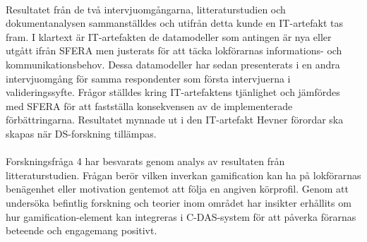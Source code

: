\paragraph{}
\hspace{-11pt}Resultatet från de två intervjuomgångarna, litteraturstudien och dokumentanalysen sammanställdes och utifrån detta kunde en IT-artefakt tas fram.
I klartext är IT-artefakten de datamodeller som antingen är nya eller utgått ifrån SFERA men justerats för att täcka lokförarnas informations- och kommunikationsbehov.
Dessa datamodeller har sedan presenterats i en andra intervjuomgång för samma respondenter som första intervjuerna i valideringssyfte.
Frågor ställdes kring IT-artefaktens tjänlighet och jämfördes med SFERA för att fastställa konsekvensen av de implementerade förbättringarna.
Resultatet mynnade ut i den IT-artefakt Hevner förordar ska skapas när DS-forskning tillämpas.
\paragraph{}
\hspace{-11pt}Forskningsfråga 4 har besvarats genom analys av resultaten från litteraturstudien.
Frågan berör vilken inverkan gamification kan ha på lokförarnas benägenhet eller motivation gentemot att följa en angiven körprofil.
Genom att undersöka befintlig forskning och teorier inom området har insikter erhållits om hur gamification-element kan integreras i C-DAS-system för att påverka förarnas beteende och engagemang positivt.